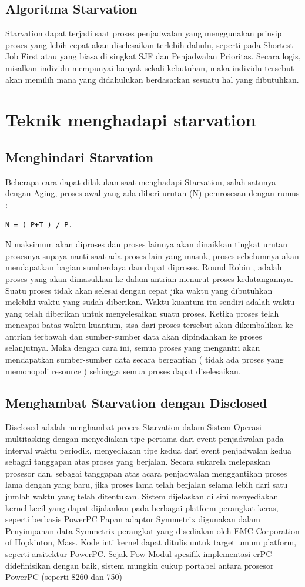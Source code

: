 \subsection{Algoritma Starvation}
Starvation dapat terjadi saat proses penjadwalan yang menggunakan prinsip proses yang lebih cepat akan diselesaikan terlebih dahulu, seperti pada Shortest Job First atau yang biasa di singkat SJF dan Penjadwalan Prioritas.
Secara logis, misalkan individu mempunyai banyak sekali kebutuhan, maka individu tersebut akan memilih mana yang didahulukan berdasarkan sesuatu hal yang dibutuhkan.
\section{Teknik menghadapi starvation}
\subsection {Menghindari Starvation}
Beberapa cara dapat dilakukan saat menghadapi Starvation, salah satunya dengan Aging,  proses awal yang ada diberi urutan
(N) pemrosesan dengan rumus : 
\begin{verbatim}
N = ( P+T ) / P.
\end{verbatim}

N maksimum akan diproses dan proses lainnya akan dinaikkan tingkat urutan prosesnya supaya nanti saat ada proses lain yang masuk, proses sebelumnya akan mendapatkan bagian sumberdaya dan dapat diproses.
Round Robin , adalah proses yang akan dimasukkan ke dalam antrian menurut proses kedatangannya. Suatu proses tidak akan selesai dengan cepat jika waktu yang dibutuhkan melebihi waktu yang sudah diberikan.
Waktu kuantum itu sendiri adalah waktu yang telah diberikan untuk menyelesaikan suatu proses. Ketika proses telah mencapai batas waktu kuantum, sisa dari proses tersebut akan dikembalikan ke antrian terbawah dan sumber-sumber data akan dipindahkan ke proses selanjutnya. Maka dengan cara ini, semua proses yang mengantri akan mendapatkan sumber-sumber data secara bergantian ( tidak ada proses yang memonopoli resource ) sehingga semua proses dapat diselesaikan.
\subsection {Menghambat Starvation dengan Disclosed}
\cite{chalmer2004inhibiting} Disclosed adalah menghambat proces Starvation dalam Sistem Operasi multitasking dengan menyediakan tipe pertama dari event penjadwalan pada interval waktu periodik, menyediakan tipe kedua dari event penjadwalan kedua sebagai tanggapan atas proses yang berjalan. Secara sukarela melepaskan prosesor dan, sebagai tanggapan atas acara penjadwalan menggantikan proses lama dengan yang baru, jika proses lama telah berjalan selama lebih dari satu jumlah waktu yang telah ditentukan. Sistem dijelaskan di sini menyediakan kernel kecil yang dapat dijalankan pada berbagai platform perangkat keras, seperti berbasis PowerPC Papan adaptor Symmetrix digunakan dalam Penyimpanan data Symmetrix perangkat yang disediakan oleh EMC Corporation of Hopkinton, Mass. Kode inti kernel dapat ditulis untuk target umum platform, seperti arsitektur PowerPC. Sejak Pow Modul spesifik implementasi erPC didefinisikan dengan baik, sistem mungkin cukup portabel antara prosesor PowerPC (seperti 8260 dan 750)
